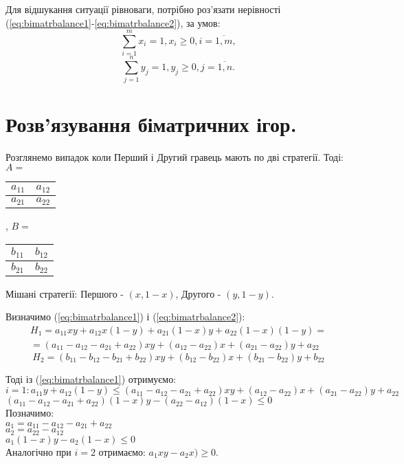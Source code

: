 \documentclass[12pt,a4paper]{book}
\begin{document}
Для відшукання ситуації рівноваги, потрібно роз’язати нерівності (\ref{eq:bimatrbalance1}-\ref{eq:bimatrbalance2}), за умов:
\[ \sum_{i=1}^m x_i = 1, x_i \ge 0, i = \overline{1,m}, \]
\[ \sum_{j=1}^n y_j = 1, y_j \ge 0, j = \overline{1,n}. \]

\clearpage

\section{Розв'язування біматричних ігор.}

Розглянемо випадок коли Перший і Другий гравець мають по дві стратегії. Тоді:\\
$A =$
\begin{tabular}{|c|c|}
\hline
$a_{1 1}$&$a_{1 2}$\\
\hline
$a_{2 1}$&$a_{2 2}$\\
\hline
\end{tabular},
$B =$
\begin{tabular}{|c|c|}
\hline
$b_{1 1}$&$b_{1 2}$\\
\hline
$b_{2 1}$&$b_{2 2}$\\
\hline
\end{tabular}

Мішані стратегії: Першого - $(x,1-x)$, Другого - $(y,1-y)$.

Визначимо (\ref{eq:bimatrbalance1}) і (\ref{eq:bimatrbalance2}):\\
\[\begin{array}{c}
H_1 = a_{11}xy + a_{12}x(1-y) + a_{21}(1-x)y + a_{22}(1-x)(1-y) =\\
= (a_{11}-a_{12}-a_{21}+a_{22})xy + (a_{12}-a_{22})x + (a_{21}-a_{22})y + a_{22}
\end{array}\]
\[H_2 = (b_{11}-b_{12}-b_{21}+b_{22})xy + (b_{12}-b_{22})x + (b_{21}-b_{22})y + b_{22} \]

Тоді із (\ref{eq:bimatrbalance1}) отримуємо:\\
$ i=1: a_{11}y+a_{12}(1-y) \le (a_{11}-a_{12}-a_{21}+a_{22})xy + (a_{12}-a_{22})x + (a_{21}-a_{22})y + a_{22} $\\
$(a_{11}-a_{12}-a_{21}+a_{22})(1-x)y - (a_{22}-a_{12})(1-x) \le 0$\\
Позначимо:\\
$a_1 = a_{11}-a_{12}-a_{21}+a_{22}$\\
$a_2 = a_{22}-a_{12}$\\
$a_1(1-x)y - a_2(1-x) \le 0$\\
Аналогічно при $i=2$ отримаємо: $a_1xy - a_2x) \ge 0$.
\end{document}
